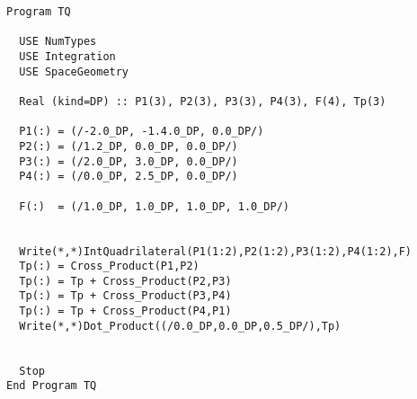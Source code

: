 \begin{lstlisting}[emph=IntQuadrilateral,
                   emphstyle=\color{blue},
                   frame=trBL,
                   caption=Computing the area of a quadrilateral.,
                   label=intquadrilateral]
Program TQ

  USE NumTypes
  USE Integration
  USE SpaceGeometry

  Real (kind=DP) :: P1(3), P2(3), P3(3), P4(3), F(4), Tp(3)

  P1(:) = (/-2.0_DP, -1.4.0_DP, 0.0_DP/)
  P2(:) = (/1.2_DP, 0.0_DP, 0.0_DP/)
  P3(:) = (/2.0_DP, 3.0_DP, 0.0_DP/)
  P4(:) = (/0.0_DP, 2.5_DP, 0.0_DP/)

  F(:)  = (/1.0_DP, 1.0_DP, 1.0_DP, 1.0_DP/)


  Write(*,*)IntQuadrilateral(P1(1:2),P2(1:2),P3(1:2),P4(1:2),F)
  Tp(:) = Cross_Product(P1,P2)
  Tp(:) = Tp + Cross_Product(P2,P3)
  Tp(:) = Tp + Cross_Product(P3,P4)
  Tp(:) = Tp + Cross_Product(P4,P1)
  Write(*,*)Dot_Product((/0.0_DP,0.0_DP,0.5_DP/),Tp)


  Stop
End Program TQ
\end{lstlisting}


